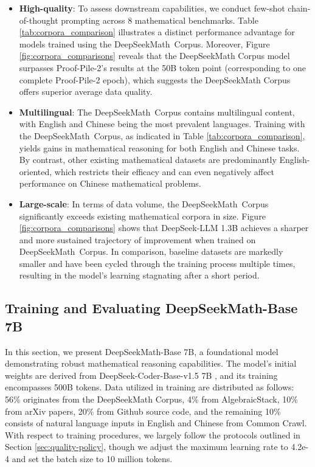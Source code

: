 \begin{itemize}[topsep=0pt]
\begin{itemize}[topsep=0pt]
    \item \textbf{High-quality}:
    To assess downstream capabilities, we conduct few-shot chain-of-thought prompting \cite{cot} across 8 mathematical benchmarks. Table \ref{tab:corpora_comparison} illustrates a distinct performance advantage for models trained using the DeepSeekMath~Corpus. Moreover, Figure \ref{fig:corpora_comparisons} reveals that the DeepSeekMath Corpus model surpasses Proof-Pile-2’s results at the 50B token point (corresponding to one complete Proof-Pile-2 epoch), which suggests the DeepSeekMath Corpus offers superior average data quality.
    \item \textbf{Multilingual}:
    The DeepSeekMath~Corpus contains multilingual content, with English and Chinese being the most prevalent languages. Training with the DeepSeekMath~Corpus, as indicated in Table \ref{tab:corpora_comparison}, yields gains in mathematical reasoning for both English and Chinese tasks. By contrast, other existing mathematical datasets are predominantly English-oriented, which restricts their efficacy and can even negatively affect performance on Chinese mathematical problems.
    \item \textbf{Large-scale}:
    In terms of data volume, the DeepSeekMath~Corpus significantly exceeds existing mathematical corpora in size. Figure \ref{fig:corpora_comparisons} shows that DeepSeek-LLM 1.3B achieves a sharper and more sustained trajectory of improvement when trained on DeepSeekMath~Corpus. In comparison, baseline datasets are markedly smaller and have been cycled through the training process multiple times, resulting in the model’s learning stagnating after a short period.
\end{itemize}

\subsection{Training and Evaluating DeepSeekMath-Base 7B}

In this section, we present DeepSeekMath-Base 7B, a foundational model demonstrating robust mathematical reasoning capabilities. The model's initial weights are derived from DeepSeek-Coder-Base-v1.5 7B \citep{deepseek-coder}, and its training encompasses 500B tokens. Data utilized in training are distributed as follows: 56\% originates from the DeepSeekMath Corpus, 4\% from AlgebraicStack, 10\% from arXiv papers, 20\% from Github source code, and the remaining 10\% consists of natural language inputs in English and Chinese from Common Crawl. With respect to training procedures, we largely follow the protocols outlined in Section \ref{sec:quality-policy}, though we adjust the maximum learning rate to 4.2e-4 and set the batch size to 10 million tokens.


\end{itemize}
